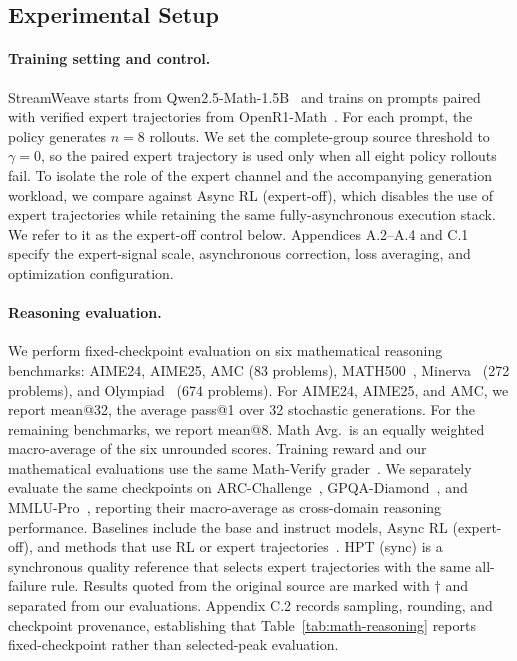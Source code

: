 \documentclass[letterpaper]{article}
\begin{document}
\subsection{Experimental Setup}
\label{sec:experimental-setup}

\paragraph{Training setting and control.}
StreamWeave starts from Qwen2.5-Math-1.5B~\citep{yang2024qwen25math} and trains on prompts paired with verified expert trajectories from OpenR1-Math~\citep{huggingface2025openr1}.
For each prompt, the policy generates $n=8$ rollouts.
We set the complete-group source threshold to $\gamma=0$, so the paired expert trajectory is used only when all eight policy rollouts fail.
To isolate the role of the expert channel and the accompanying generation workload, we compare against Async RL (expert-off), which disables the use of expert trajectories while retaining the same fully-asynchronous execution stack.
We refer to it as the expert-off control below.
Appendices A.2--A.4 and C.1 specify the expert-signal scale, asynchronous correction, loss averaging, and optimization configuration.

\paragraph{Reasoning evaluation.}
We perform fixed-checkpoint evaluation on six mathematical reasoning benchmarks: AIME24, AIME25, AMC (83 problems), MATH500~\citep{hendrycks2021math,lightman2024prm800k}, Minerva~\citep{lewkowycz2022minerva} (272 problems), and Olympiad~\citep{he2024olympiadbench} (674 problems).
For AIME24, AIME25, and AMC, we report mean@32, the average pass@1 over 32 stochastic generations.
For the remaining benchmarks, we report mean@8.
Math Avg.\ is an equally weighted macro-average of the six unrounded scores.
Training reward and our mathematical evaluations use the same Math-Verify grader~\citep{kydlicek2025mathverify}.
We separately evaluate the same checkpoints on ARC-Challenge~\citep{clark2018arc}, GPQA-Diamond~\citep{rein2024gpqa}, and MMLU-Pro~\citep{wang2024mmlupro}, reporting their macro-average as cross-domain reasoning performance.
Baselines include the base and instruct models, Async RL (expert-off), and methods that use RL or expert trajectories~\citep{liu2025oatzero,yan2025luffy,fu2026srft,ma2026relift}.
HPT (sync) is a synchronous quality reference that selects expert trajectories with the same all-failure rule.
Results quoted from the original source are marked with $\dagger$ and separated from our evaluations.
Appendix C.2 records sampling, rounding, and checkpoint provenance, establishing that Table~\ref{tab:math-reasoning} reports fixed-checkpoint rather than selected-peak evaluation.
\end{document}
